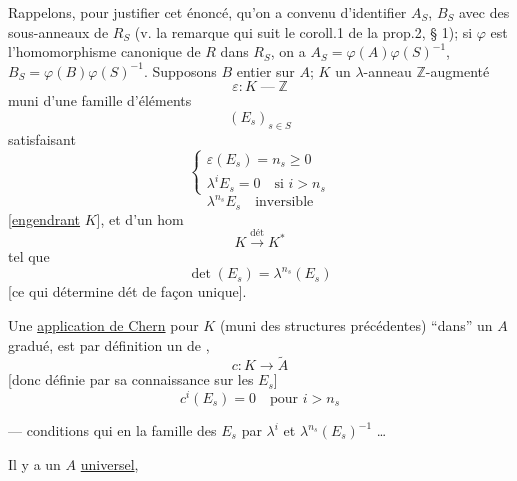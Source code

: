 Rappelons, pour justifier cet énoncé, qu'on a convenu d'identifier $A_S$, $B_S$ avec des sous-anneaux de $R_S$ (v. la remarque qui suit le coroll.1 de la prop.2, § 1); si $\varphi$ est l'homomorphisme canonique de $R$ dans $R_S$, on a $A_S=\varphi(A)\varphi(S)^{-1}$, $B_S=\varphi(B)\varphi(S)^{-1}$. Supposons $B$ entier sur $A$;
$K$ un $\lambda$-anneau $\mathbb Z$-augmenté
\[
\varepsilon:K\mathbin{\text{---}}\mathbb Z
\]
muni d'une famille d'éléments
\[
(E_s)_{s\in S}
\]
satisfaisant
\[
\left\{\begin{array}{l}
\varepsilon(E_s)=n_s\geq0\\
\lambda^i E_s=0\quad\text{si }i>n_s
\end{array}\right.
\]
\[
\lambda^{n_s}E_s\quad\text{inversible}
\]
[\uline{engendrant} $K$],  et d'un hom
\[
K\xrightarrow{\text{dét}}K^*
\]
tel que
\[
\det(E_s)=\lambda^{n_s}(E_s)
\]
[ce qui détermine dét de façon unique]. \deleted{\unsure{$\}$}}

Une \uline{application de Chern} pour $K$ (muni des structures précédentes) ``dans'' un $A$ gradué, est par définition un  de ,
\[
c:K\longrightarrow\widetilde A
\]
[donc définie par sa connaissance sur les $E_s$] 
\[
\boxed{c^i(E_s)=0\quad\text{pour }i>n_s}
\]

--- conditions qui  en  la famille des $E_s$ par $\lambda^i$ et $\lambda^{n_s}(E_s)^{-1}$ \ldots

Il y a un $A$ \uline{universel},

